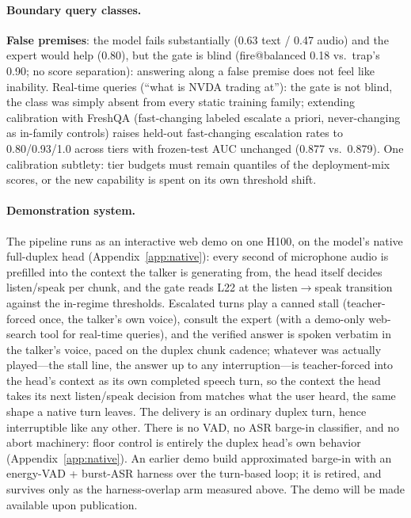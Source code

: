 \paragraph{Boundary query classes.} \textbf{False premises}: the model
fails substantially (0.63 text / 0.47 audio) and the expert would help
(0.80), but the gate is blind (fire@balanced 0.18 vs.\ trap's 0.90; no
score separation): answering along a false premise does not feel
like inability. Real-time queries (``what is NVDA trading at''):
the gate is not blind, the class was simply absent from every static
training family; extending calibration with FreshQA
\citep{vu2023freshllms} (fast-changing labeled escalate a priori,
never-changing as in-family controls) raises held-out fast-changing
escalation rates to 0.80/0.93/1.0 across tiers with frozen-test AUC unchanged
(0.877 vs.\ 0.879). One calibration subtlety: tier budgets must remain
quantiles of the deployment-mix scores, or the new capability is
spent on its own threshold shift.

\paragraph{Demonstration system.} The pipeline runs as an interactive
web demo on one H100, on the model's native full-duplex head
(Appendix~\ref{app:native}): every second of microphone audio is
prefilled into the context the talker is generating from, the head
itself decides listen/speak per chunk, and the gate reads L22 at the
listen$\to$speak transition against the in-regime thresholds.
Escalated turns play a canned stall (teacher-forced once, the talker's
own voice), consult the expert (with a demo-only web-search tool for
real-time queries), and the verified answer is spoken verbatim in the
talker's voice, paced on the duplex chunk cadence; whatever was
actually played---the stall line, the answer up to any
interruption---is teacher-forced into the head's context as its own
completed speech turn, so the context the head takes its next
listen/speak decision from matches what the user heard, the same
shape a native turn leaves. The delivery is an ordinary duplex turn,
hence interruptible like any other. There is no VAD, no ASR barge-in
classifier, and no abort machinery: floor control is entirely the
duplex head's own behavior (Appendix~\ref{app:native}). An earlier
demo build approximated barge-in with an energy-VAD + burst-ASR
harness over the turn-based loop; it is retired, and survives only as
the harness-overlap arm measured above. The demo will be made
available upon publication.

